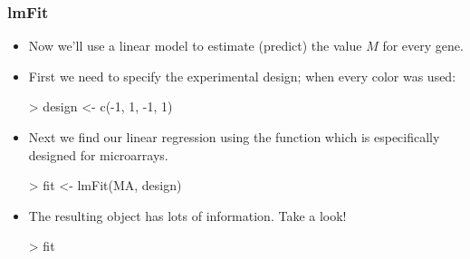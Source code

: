 \begin{frame}
  \frametitle{lmFit}
  \begin{itemize}
  \item Now we'll use a linear model to estimate (predict) the value $M$ for every gene.
  \item First we need to specify the experimental design; when every color was used:
\begin{Schunk}
\begin{Sinput}
> design <- c(-1, 1, -1, 1)
\end{Sinput}
\end{Schunk}
  \item Next we find our linear regression using the function  which is especifically designed for microarrays.
\begin{Schunk}
\begin{Sinput}
> fit <- lmFit(MA, design)
\end{Sinput}
\end{Schunk}
  \item The resulting object has lots of information. Take a look!
\begin{Schunk}
\begin{Sinput}
> fit
\end{Sinput}
\end{Schunk}
  \end{itemize}
\end{frame}

